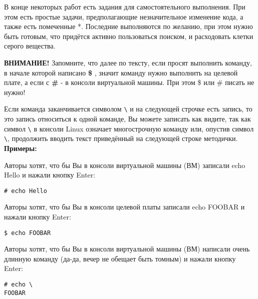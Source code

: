 В конце некоторых работ есть задания для самостоятельного выполнения. При этом есть простые задачи, предполагающие незначительное изменение кода, а также есть помеченные *. Последние выполняются по желанию, при этом нужно быть готовым, что придётся активно пользоваться поиском, и расходовать клетки серого вещества.

\textbf{ВНИМАНИЕ!} Запомните, что далее по тексту, если просят выполнить команду, в начале которой написано \textbf{\$} , значит команду нужно выполнить на целевой плате, а если с \textbf{\#} - в консоли виртуальной машины. При этом \$ или \# писать не нужно! 

Если команда заканчивается символом \verb!\! и на следующей строчке есть запись, то это запись относиться к одной команде, Вы можете записать как видите, так как символ \verb!\! в консоли Linux означает многострочную команду или, опустив символ \verb!\!, продолжить вводить текст приведённый на следующей строке методички.\\


\textbf{Примеры:}

Авторы хотят, что бы Вы в консоли виртуальной машины (ВМ) записали echo Hello и нажали кнопку Enter:

\begin{lstlisting}[style=bash]
# echo Hello 
\end{lstlisting}

Авторы хотят, что бы Вы в консоли целевой платы записали echo FOOBAR и нажали кнопку Enter:

\begin{lstlisting}[style=bash]
$ echo FOOBAR
\end{lstlisting}

Авторы хотят, что бы Вы в консоли виртуальной машины (ВМ) написали очень длинную команду (да-да, вечер не обещает быть томным) и нажали кнопку  Enter:

\begin{lstlisting}[style=bash]
# echo \
FOOBAR 
\end{lstlisting}